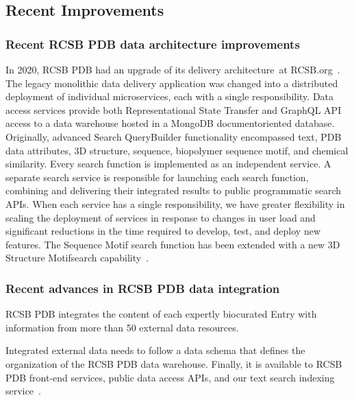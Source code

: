 \documentclass{report}
\begin{document}
\subsection{Recent Improvements}

\subsubsection*{Recent RCSB PDB data architecture improvements}

In 2020, RCSB PDB had an upgrade of its delivery architecture~\cite{rose_rcsb_2021}at RCSB.org~\cite{powerful_rcsb_2021}. The legacy monolithic data delivery application was changed into a distributed deployment of individual microservices, each with a single responsibility. Data access services provide both Representational State Transfer and GraphQL API access to a data warehouse hosted in a MongoDB documentoriented database. Originally, advanced Search QueryBuilder functionality encompassed text, PDB data attributes, 3D structure, sequence, biopolymer sequence motif, and chemical similarity. Every search function is implemented as an independent service. A separate search service is responsible for launching each search function, combining and delivering their integrated results to public programmatic search APIs. When each service has a single responsibility, we have greater flexibility in scaling the deployment of services in response to changes in user load and significant reductions in the time required to develop, test, and deploy new features. The Sequence Motif search function has been extended with a new 3D Structure Motifsearch capability~\cite{bittrich_real-time_2020}. 

\subsubsection*{Recent advances in RCSB PDB data integration}

RCSB PDB integrates the content of each expertly biocurated Entry with information from more than 50 external data resources. 

Integrated external data needs to follow a data schema that defines the organization of the RCSB PDB data warehouse. Finally, it is available to RCSB PDB front-end services, public data access APIs, and our text search indexing service~\cite{burley_rcsb_2022}.
\end{document}
